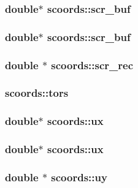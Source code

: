 \subsubsection{\setlength{\rightskip}{0pt plus 5cm}double$\ast$ {\bf scoords::scr\_\-buf}}\label{structscoords_ff7b2fee4b5ad3f62487c84309286222}


\subsubsection{\setlength{\rightskip}{0pt plus 5cm}double$\ast$ {\bf scoords::scr\_\-buf}}\label{structscoords_ff7b2fee4b5ad3f62487c84309286222}


\subsubsection{\setlength{\rightskip}{0pt plus 5cm}double $\ast$ {\bf scoords::scr\_\-rec}}\label{structscoords_023d532bbf870f31c1d1bf0d61ec0634}


\subsubsection{ {\bf scoords::tors}}\label{structscoords_78c070b2ead72f2dbf9924ec133d4acf}


\subsubsection{\setlength{\rightskip}{0pt plus 5cm}double$\ast$ {\bf scoords::ux}}\label{structscoords_575f7499d9645d796fc3d15d0f9db810}


\subsubsection{\setlength{\rightskip}{0pt plus 5cm}double$\ast$ {\bf scoords::ux}}\label{structscoords_575f7499d9645d796fc3d15d0f9db810}


\subsubsection{\setlength{\rightskip}{0pt plus 5cm}double $\ast$ {\bf scoords::uy}}\label{structscoords_6d415cc2dbced2267ca315dbdb78e87f}


